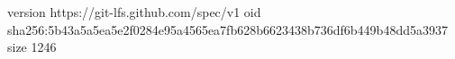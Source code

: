 version https://git-lfs.github.com/spec/v1
oid sha256:5b43a5a5ea5e2f0284e95a4565ea7fb628b6623438b736df6b449b48dd5a3937
size 1246
